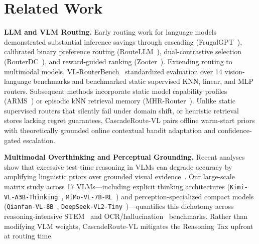 \documentclass[10pt,twocolumn,letterpaper]{article}
\begin{document}
\section{Related Work}
\label{sec:related}

\textbf{LLM and VLM Routing.} Early routing work for language models demonstrated substantial inference savings through cascading (FrugalGPT~\citep{chen2023frugalgpt}), calibrated binary preference routing (RouteLLM~\citep{ong2025routellm}), dual-contrastive selection (RouterDC~\citep{chen2024routerdc}), and reward-guided ranking (Zooter~\citep{lu2024zooter}). Extending routing to multimodal models, VL-RouterBench~\citep{huang2025vlrouterbench} standardized evaluation over 14 vision-language benchmarks and benchmarked static supervised KNN, linear, and MLP routers. Subsequent methods incorporate static model capability profiles (ARMS~\citep{wang2026arms}) or episodic kNN retrieval memory (MHR-Router~\citep{zhu2026mhr}). Unlike static supervised routers that silently fail under domain shift, or heuristic retrieval stores lacking regret guarantees, CascadeRoute-VL pairs offline warm-start priors with theoretically grounded online contextual bandit adaptation and confidence-gated escalation.

\textbf{Multimodal Overthinking and Perceptual Grounding.} Recent analyses show that excessive test-time reasoning in VLMs can degrade accuracy by amplifying linguistic priors over grounded visual evidence~\citep{shoby2026overthinking}. Our large-scale matrix study across 17 VLMs---including explicit thinking architectures (\texttt{Kimi-VL-A3B-Thinking}~\citep{kimi2025kimivl}, \texttt{MiMo-VL-7B-RL}~\citep{xiaomi2025mimovl}) and perception-specialized compact models (\texttt{Qianfan-VL-8B}~\citep{dong2025qianfanvl}, \texttt{DeepSeek-VL2-Tiny}~\citep{wu2024deepseekvl2})---quantifies this dichotomy across reasoning-intensive STEM~\citep{lu2024mathvista,zhang2024mathverse,kembhavi2016ai2d} and OCR/hallucination~\citep{liu2024ocrbench,singh2019textvqa,guan2024hallusionbench} benchmarks. Rather than modifying VLM weights, CascadeRoute-VL mitigates the Reasoning Tax upfront at routing time.
\end{document}
